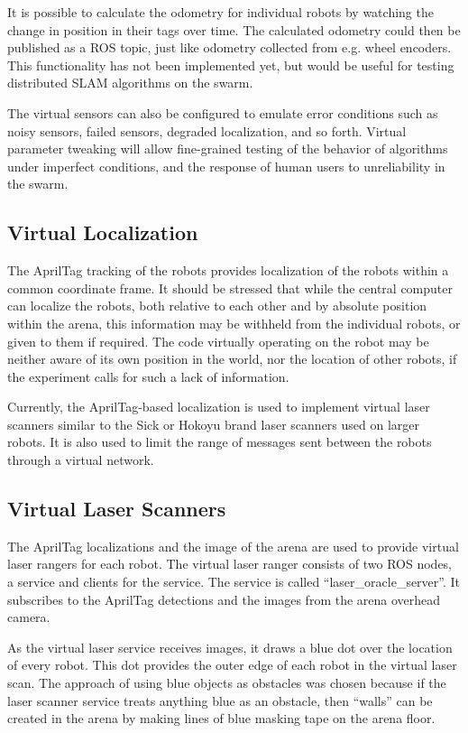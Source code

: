 \documentclass[]{article}
\begin{document}
It is possible to calculate the odometry for individual robots by watching the change in position in their tags over time. 
The calculated odometry could then be published as a ROS topic, just like odometry collected from e.g. wheel encoders. 
This functionality has not been implemented yet, but would be useful for testing distributed SLAM algorithms on the swarm. 

The virtual sensors can also be configured to emulate error conditions such as noisy sensors, failed sensors, degraded localization, and so forth.
Virtual parameter tweaking will allow fine-grained testing of the behavior of algorithms under imperfect conditions, and the response of human users to unreliability in the swarm. 

\subsection{Virtual Localization}

The AprilTag tracking of the robots provides localization of the robots within a common coordinate frame. 
It should be stressed that while the central computer can localize the robots, both relative to each other and by absolute position within the arena, this information may be withheld from the individual robots, or given to them if required. 
The code virtually operating on the robot may be neither aware of its own position in the world, nor the location of other robots, if the experiment calls for such a lack of information. 

Currently, the AprilTag-based localization is used to implement virtual laser scanners similar to the Sick or Hokoyu brand laser scanners used on larger robots. 
It is also used to limit the range of messages sent between the robots through a virtual network. 

\subsection{Virtual Laser Scanners}

The AprilTag localizations and the image of the arena are used to provide virtual laser rangers for each robot. 
The virtual laser ranger consists of two ROS nodes, a service and clients for the service. 
The service is called ``laser\_oracle\_server''. 
It subscribes to the AprilTag detections and the images from the arena overhead camera. 

As the virtual laser service receives images, it draws a blue dot over the location of every robot. 
This dot provides the outer edge of each robot in the virtual laser scan. 
The approach of using blue objects as obstacles was chosen because if the laser scanner service treats anything blue as an obstacle, then ``walls'' can be created in the arena by making lines of blue masking tape on the arena floor. 
 
\end{document}
